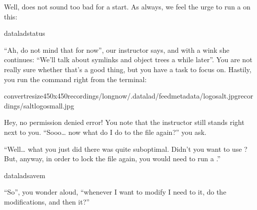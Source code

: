 \sphinxAtStartPar
Well,  does not sound too bad for a start. As always, we
feel the urge to run a  on this:

\begin{sphinxVerbatim}[commandchars=\\\{\}]
dataladstatus
\end{sphinxVerbatim}

\sphinxAtStartPar
“Ah, do not mind that for now”, our instructor says, and with a wink she
continues: “We’ll talk about symlinks and object trees a while later”.
You are not really sure whether that’s a good thing, but you have a task to focus
on. Hastily, you run the command right from the terminal:

\begin{sphinxVerbatim}[commandchars=\\\{\}]
convert\PYGZhy{}resize450x450recordings/longnow/.datalad/feed\PYGZus{}metadata/logo\PYGZus{}salt.jpgrecordings/salt\PYGZus{}logo\PYGZus{}small.jpg
\end{sphinxVerbatim}

\sphinxAtStartPar
Hey, no permission denied error! You note that the instructor still stands
right next to you. “Sooo… now what do I do to  the file again?” you ask.

\sphinxAtStartPar
“Well… what you just did there was quite suboptimal. Didn’t you want to
use ? But, anyway, in order to lock the file again, you would need to
run a .”

\begin{sphinxVerbatim}[commandchars=\\\{\}]
dataladsave\PYGZhy{}m
\end{sphinxVerbatim}

\sphinxAtStartPar
“So”, you wonder aloud, “whenever I want to modify I need to
 it, do the modifications, and then  it?”

